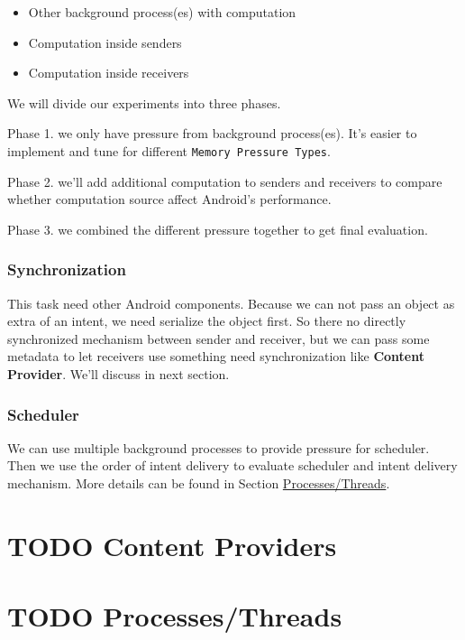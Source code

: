 \documentclass[11pt]{article}
\begin{document}
\begin{itemize}
\item Other background process(es) with computation
\item Computation inside senders
\item Computation inside receivers
\end{itemize}

We will divide our experiments into three phases.

Phase 1. we only have pressure from background process(es).
It's easier to implement and tune for different \texttt{Memory Pressure Types}.

Phase 2. we'll add additional computation to senders and receivers to compare
whether computation source affect Android's performance.

Phase 3. we combined the different pressure together to get final evaluation.

\subsubsection{Synchronization}
\label{sec-3-2-2}
This task need other Android components.
Because we can not pass an object as extra of an intent, we need serialize the object first.
So there no directly synchronized mechanism between sender and receiver,
but we can pass some metadata to let receivers use something need synchronization like \textbf{Content Provider}. We'll discuss in next section.

\subsubsection{Scheduler}
\label{sec-3-2-3}
We can use multiple background processes to provide pressure for scheduler.
Then we use the order of intent delivery to evaluate scheduler and intent delivery mechanism. More details can be found in Section \hyperref[Processes/Threads]{Processes/Threads}.

\section{{\bfseries\sffamily TODO} Content Providers}
\label{sec-4}

\section{{\bfseries\sffamily TODO} \label{Processes/Threads}Processes/Threads}
\label{sec-5}
\end{document}
